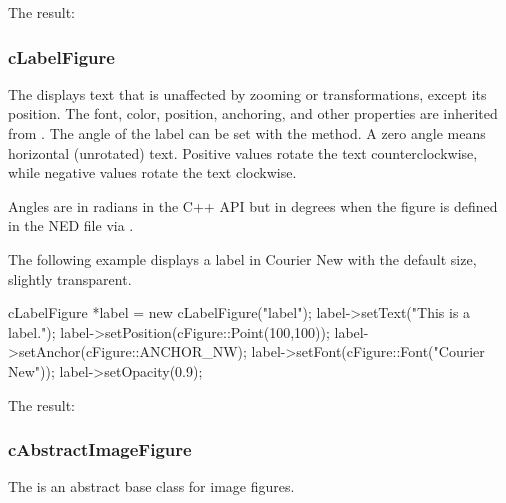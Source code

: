 
The result:

\begin{center}

\end{center}


\subsubsection{cLabelFigure}
\label{sec:graphics:labelfigure}

The  displays text that is unaffected by zooming or
transformations, except its position. The font, color, position, anchoring, and
other properties are inherited from . The angle of
the label can be set with the  method. A zero angle means
horizontal (unrotated) text. Positive values rotate the text counterclockwise,
while negative values rotate the text clockwise.

\begin{note}
Angles are in radians in the C++ API but in degrees when the figure is defined
in the NED file via .
\end{note}

The following example displays a label in Courier New with the default size, slightly transparent.

\begin{cpp}
cLabelFigure *label = new cLabelFigure("label");
label->setText("This is a label.");
label->setPosition(cFigure::Point(100,100));
label->setAnchor(cFigure::ANCHOR_NW);
label->setFont(cFigure::Font("Courier New"));
label->setOpacity(0.9);
\end{cpp}


The result:

\begin{center}

\end{center}


\subsubsection{cAbstractImageFigure}
\label{sec:graphics:abstractimagefigure}

The  is an abstract base class for image figures.

